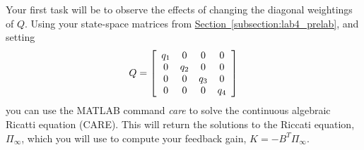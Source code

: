 \documentclass[12pt]{report}
\begin{document}
Your first task will be to observe the effects of changing the diagonal weightings of $Q$. Using your state-space matrices from \hyperref[subsection:lab4_prelab]{Section~\ref{subsection:lab4_prelab}}, and setting
\[
    Q = \left[\begin{array}{c c c c}
            q_1 & 0   & 0   & 0   \\
            0   & q_2 & 0   & 0   \\
            0   & 0   & q_3 & 0   \\
            0   & 0   & 0   & q_4
        \end{array}\right]
\]
you can use the MATLAB command \emph{care} to solve the continuous algebraic Ricatti equation (CARE). This will return the solutions to the Riccati equation, $\Pi_{\infty}$, which you will use to compute your feedback gain, $K=-B^T \Pi_{\infty}$.
\end{document}
